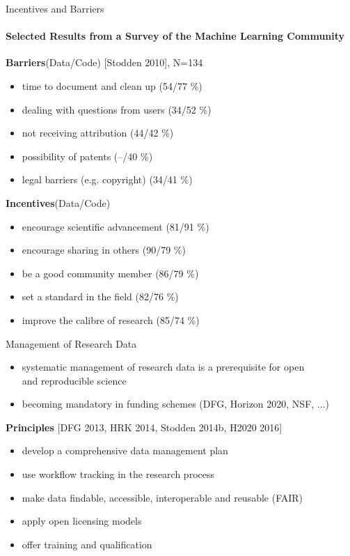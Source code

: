 \documentclass{beamer}
\newcommand\data[1]{{\color{structure.fg}#1}}
\begin{document}
\begin{frame}{Incentives and Barriers}
\framesubtitle{Selected Results from a Survey of the Machine Learning Community}

\textbf{Barriers}(\data{Data}/Code) {\tiny [Stodden 2010], N=134}
\begin{itemize}
\item time to document and clean up (\data{54}/77 \%)
\item dealing with questions from users (\data{34}/52 \%)
\item not receiving attribution (\data{44}/42 \%)
\item possibility of patents (\data{--}/40 \%)
\item legal barriers (e.g. copyright) (\data{34}/41 \%)
\end{itemize}

\vspace{3mm}

\textbf{Incentives}(\data{Data}/Code)
\begin{itemize}
\item encourage scientific advancement (\data{81}/91 \%)
\item encourage sharing in others (\data{90}/79 \%)
\item be a good community member (\data{86}/79 \%)
\item set a standard in the field (\data{82}/76 \%)
\item improve the calibre of research (\data{85}/74 \%)
\end{itemize}

\end{frame}


\begin{frame}{Management of Research Data}

\begin{itemize}
\item systematic management of research data is a prerequisite for open \\ and reproducible science
\item becoming mandatory in funding schemes (DFG, Horizon 2020, NSF, ...)
\end{itemize}

\vfill

\textbf{Principles} {\tiny [DFG 2013, HRK 2014, Stodden 2014b, H2020 2016]}
\begin{itemize}
\item develop a comprehensive data management plan
\item use workflow tracking in the research process
\item make data findable, accessible, interoperable and reusable (FAIR)
\item apply open licensing models
\item offer training and qualification
\end{itemize}

\end{frame}
\end{document}
